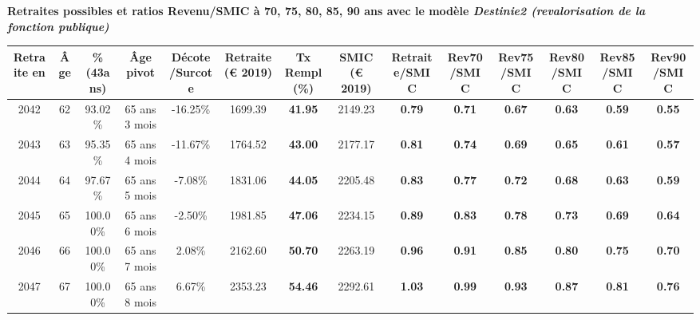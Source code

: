  \vspace{0.1cm} 
{\bf \noindent Retraites possibles et ratios Revenu/SMIC à 70, 75, 80, 85, 90 ans avec le modèle \emph{Destinie2 (revalorisation de la fonction publique)}}  
 
\begin{adjustbox}{max width=\textwidth} 
\begin{tabular}[htb]{|c|c||c|c|c||c|c||c||c|c|c|c|c|c|} 
\hline 
 Retraite en &  Âge &  \%(43ans) &  Âge pivot &  Décote/Surcote &  Retraite (\euro{} 2019) &  Tx Rempl(\%) &  SMIC (\euro{} 2019) &  Retraite/SMIC &  Rev70/SMIC &  Rev75/SMIC &  Rev80/SMIC &  Rev85/SMIC &  Rev90/SMIC \\ 
\hline \hline 
 2042 &  62 &  93.02\% &  65 ans 3 mois &  -16.25\% &  1699.39 &  {\bf 41.95} &  2149.23 &  {\bf {\color{red} 0.79}} &  {\bf {\color{red} 0.71}} &  {\bf {\color{red} 0.67}} &  {\bf {\color{red} 0.63}} &  {\bf {\color{red} 0.59}} &  {\bf {\color{red} 0.55}} \\ 
\hline 
 2043 &  63 &  95.35\% &  65 ans 4 mois &  -11.67\% &  1764.52 &  {\bf 43.00} &  2177.17 &  {\bf {\color{red} 0.81}} &  {\bf {\color{red} 0.74}} &  {\bf {\color{red} 0.69}} &  {\bf {\color{red} 0.65}} &  {\bf {\color{red} 0.61}} &  {\bf {\color{red} 0.57}} \\ 
\hline 
 2044 &  64 &  97.67\% &  65 ans 5 mois &  -7.08\% &  1831.06 &  {\bf 44.05} &  2205.48 &  {\bf {\color{red} 0.83}} &  {\bf {\color{red} 0.77}} &  {\bf {\color{red} 0.72}} &  {\bf {\color{red} 0.68}} &  {\bf {\color{red} 0.63}} &  {\bf {\color{red} 0.59}} \\ 
\hline 
 2045 &  65 &  100.00\% &  65 ans 6 mois &  -2.50\% &  1981.85 &  {\bf 47.06} &  2234.15 &  {\bf {\color{red} 0.89}} &  {\bf {\color{red} 0.83}} &  {\bf {\color{red} 0.78}} &  {\bf {\color{red} 0.73}} &  {\bf {\color{red} 0.69}} &  {\bf {\color{red} 0.64}} \\ 
\hline 
 2046 &  66 &  100.00\% &  65 ans 7 mois &  2.08\% &  2162.60 &  {\bf 50.70} &  2263.19 &  {\bf {\color{red} 0.96}} &  {\bf {\color{red} 0.91}} &  {\bf {\color{red} 0.85}} &  {\bf {\color{red} 0.80}} &  {\bf {\color{red} 0.75}} &  {\bf {\color{red} 0.70}} \\ 
\hline 
 2047 &  67 &  100.00\% &  65 ans 8 mois &  6.67\% &  2353.23 &  {\bf 54.46} &  2292.61 &  {\bf 1.03} &  {\bf {\color{red} 0.99}} &  {\bf {\color{red} 0.93}} &  {\bf {\color{red} 0.87}} &  {\bf {\color{red} 0.81}} &  {\bf {\color{red} 0.76}} \\ 
\hline 
\hline 
\end{tabular} 
\end{adjustbox} 
 
